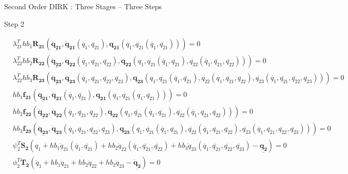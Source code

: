 \documentclass{beamer}
\begin{document}
\begin{frame}[allowframebreaks]{Second Order DIRK : Three Stages -- Three Steps}
  \begin{block}{Step 2}
    \begin{minipage}{1.0\textwidth}
      \begin{minipage}{1.0\textwidth}
        \begin{equation}\nonumber
          \begin{split}
            &\lambda_{21}^T h b_1 \mathbf{R_{21}}\left(\underline{\mathbf{\ddot{q}_{21}}},\mathbf{\dot{q}_{21}}(\dot{q_1},\ddot{q_{21}}),\mathbf{{q}_{21}}({q_1},\dot{q_{21}}(\dot{q_1},\ddot{q_{21}}))\right) = 0 \\
            &\lambda_{22}^T h b_2 \mathbf{R_{22}}\left(\underline{\mathbf{\ddot{q}_{22}}},\mathbf{\dot{q}_{22}}(\dot{q_1},\ddot{q_{21}},\ddot{q_{22}}),\mathbf{{q}_{22}}({q_1},\dot{q_{21}}(\dot{q_1},\ddot{q_{21}}),\dot{q_{22}}(\dot{q_1},\ddot{q_{21}},\ddot{q_{22}}))\right) = 0 \\
            &\lambda_{22}^T h b_3 \mathbf{R_{23}}\left(\underline{\mathbf{\ddot{q}_{23}}},
\mathbf{\dot{q}_{23}}(\dot{q_1},\ddot{q_{21}},\ddot{q_{22}},\ddot{q_{23}}),
\mathbf{{q}_{23}}({q_1},\dot{q_{21}}(\dot{q_1},\ddot{q_{21}}),\dot{q_{22}}(\dot{q_1},\ddot{q_{21}},\ddot{q_{22}}),\dot{q_{23}}(\dot{q_1},\ddot{q_{21}},\ddot{q_{22}},\ddot{q_{23}}))\right) = 0 \\
            &h b_1 \mathbf{f_{21}}\left(\underline{\mathbf{\ddot{q}_{21}}},\mathbf{\dot{q}_{21}}(\dot{q_1},\ddot{q_{21}}),\mathbf{{q}_{21}}({q_1},\dot{q_{21}}(q_1,\ddot{q_{21}}))\right) = 0 \\
            &h b_2 \mathbf{f_{22}}\left(\underline{\mathbf{\ddot{q}_{22}}},\mathbf{\dot{q}_{22}}(\dot{q_1},\ddot{q_{21}},\ddot{q_{22}}),\mathbf{{q}_{22}}({q_1},\dot{q_{21}}(\dot{q_1},\ddot{q_{21}}),\dot{q_{22}}(\dot{q_1},\ddot{q_{21}},\ddot{q_{22}}))\right) = 0 \\
            &h b_3 \mathbf{f_{23}}\left(\underline{\mathbf{\ddot{q}_{23}}},\mathbf{\dot{q}_{23}}(\dot{q_1},\ddot{q_{21}},\ddot{q_{22}},\ddot{q_{23}}),\mathbf{{q}_{23}}({q_1},\dot{q_{21}}(\dot{q_1},\ddot{q_{21}}),\dot{q_{22}}(\dot{q_1},\ddot{q_{21}},\ddot{q_{22}}),\dot{q_{23}}(\dot{q_1},\ddot{q_{21}},\ddot{q_{22}},\ddot{q_{23}}))\right) = 0 \\
            &\psi_2^T \mathbf{S_2}\left(q_1 + h b_1 \dot{q}_{21}(\dot{q_1},\ddot{q_{21}}) +  h b_2 \dot{q}_{22} (\dot{q_1},\ddot{q_{21}},\ddot{q_{22}}) +  h b_3 \dot{q}_{23} (\dot{q_1},\ddot{q_{21}},\ddot{q_{22}},\ddot{q_{23}}) - \underline{\mathbf{q_2}} \right) = 0\\
            &\phi_2^T \mathbf{T_2}\left(\dot{q}_1 + h b_1 \ddot{q}_{21} +  h b_2 \ddot{q}_{22} +  h b_2 \ddot{q}_{23} - \underline{\mathbf{\dot{q}_2}} \right) = 0 \\

\end{split}
\end{equation}
\end{minipage}
\end{minipage}
\end{block}
\end{frame}
\end{document}
